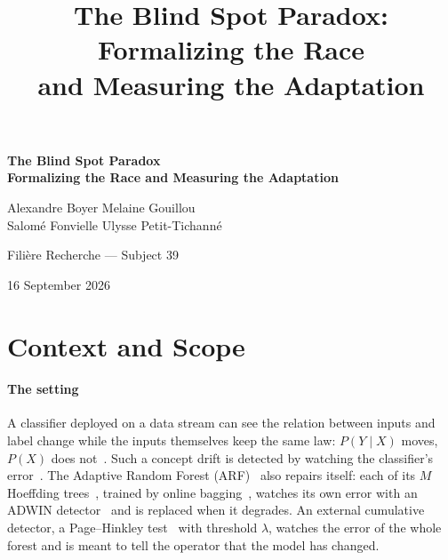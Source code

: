 \documentclass[10pt,conference]{IEEEtran}
\title{The Blind Spot Paradox: Formalizing the Race\\and Measuring the Adaptation}
\author{\IEEEauthorblockN{Alexandre Boyer, Melaine Gouillou,
Salomé Fonvielle, Ulysse Petit-Tichanné}
\IEEEauthorblockA{Filière Recherche --- Subject 39}}
\theoremstyle{definition}
\begin{document}
\onecolumn

\thispagestyle{empty}
\vspace*{\fill}
\begin{center}
  {\LARGE\bfseries The Blind Spot Paradox\\[0.4em]
   Formalizing the Race and Measuring the Adaptation\par}
  \vspace{2.5em}
  {\large Alexandre Boyer \quad Melaine Gouillou\\[0.4em]
   Salomé Fonvielle \quad Ulysse Petit-Tichanné\par}
  \vspace{2em}
  {Filière Recherche --- Subject 39\par}
  \vspace{1em}
  {16 September 2026\par}
\end{center}
\vspace*{\fill}
\newpage

\section*{Context and Scope}

\paragraph*{The setting} A classifier deployed on a data stream can see the relation
between inputs and label change while the inputs themselves keep the same law: $P(Y \mid X)$
moves, $P(X)$ does not~\cite{moreno2012}. Such a concept drift is detected by watching the
classifier's error~\cite{gama2014,lu2018}. The Adaptive Random Forest (ARF)~\cite{gomes2017}
also repairs itself: each of its $M$ Hoeffding trees~\cite{domingos2000}, trained by online
bagging~\cite{oza2001}, watches its own error with an ADWIN detector~\cite{bifet2007} and is
replaced when it degrades. An external cumulative detector, a Page--Hinkley
test~\cite{page1954,hinkley1971} with threshold $\lambda$, watches the error of the whole
forest and is meant to tell the operator that the model has changed.
\end{document}
